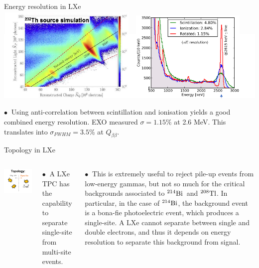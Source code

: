 \documentclass [aspectratio=169]{beamer}
\newcommand{\qbb}{\ensuremath{Q_{\beta\beta}}}
\newcommand{\TL}{\ensuremath{{}^{208}{\rm Tl}}}
\newcommand{\BI}{\ensuremath{{}^{214}{\rm Bi}}}
\begin{document}
\begin{frame}{Energy resolution in LXe}
\includegraphics[scale=0.35]{scintioniexo.png}


$\bullet~$ Using anti-correlation between scintillation and ionisation yields a good combined energy resolution. EXO measured $\sigma = 1.15$\% at 2.6 MeV. This translates into  
$\sigma_{FWHM} = 3.5$\% at \qbb.  

\end{frame}

\begin{frame}{Topology in LXe}
\begin{columns}
\includegraphics[scale=0.35]{exoTopo.png}


$\bullet~$ A LXe TPC has the capability to separate single-site from multi-site events.  

$\bullet~$ This is extremely useful to reject pile-up events from low-energy gammas, but not so much for the critical backgrounds associated to \BI\ and \TL. In particular, in the case of \BI, the background event is a bona-fie photoelectric event, which produces a single-site. A LXe cannot separate between single and double electrons, and thus it depends on energy resolution to separate this background from signal.  

\end{columns}
\end{frame}
\end{document}
